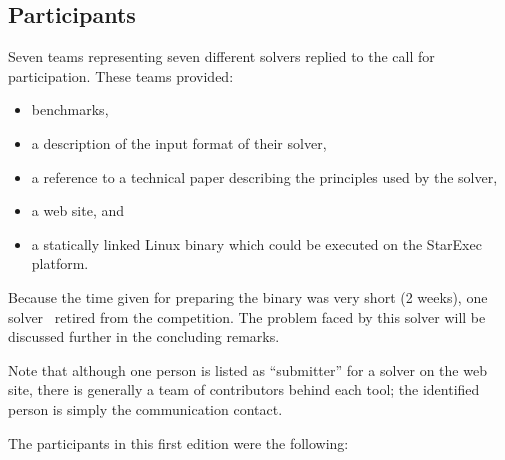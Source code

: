 \documentclass[twoside,11pt]{article}
\begin{document}
\subsection{Participants}
Seven teams representing seven different solvers replied to the call for participation.
These teams provided:
\begin{itemize}
\item benchmarks, 
\item a description of the input format of their solver, 
\item a reference to a technical paper describing the principles used by the solver, 
\item a web site, and
\item a statically linked Linux binary which could be executed on the StarExec platform.
\end{itemize}
Because the time given for preparing the binary was very short (2 weeks), one solver~\cite{HasseIOP13}
retired from the competition. The problem faced by this solver will be discussed further in the concluding remarks.

Note that although one person is listed as ``submitter'' for a solver on the web site,
there is generally a team of contributors behind each tool; the identified person is simply the communication contact.

The participants in this first edition were the following:

\end{document}
